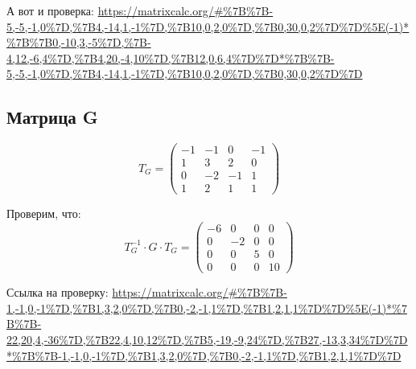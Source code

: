 \documentclass[12pt, a4paper]{article}
\begin{document}
    А вот и проверка:
    \url{https://matrixcalc.org/#%7B%7B-5,-5,-1,0%7D,%7B4,-14,1,-1%7D,%7B10,0,2,0%7D,%7B0,30,0,2%7D%7D%5E(-1)*%7B%7B0,-10,3,-5%7D,%7B-4,12,-6,4%7D,%7B4,20,-4,10%7D,%7B12,0,6,4%7D%7D*%7B%7B-5,-5,-1,0%7D,%7B4,-14,1,-1%7D,%7B10,0,2,0%7D,%7B0,30,0,2%7D%7D}



    \subsection{Матрица G}

    \begin{equation}
        T_G = \begin{pmatrix}
            -1 & -1 & 0 & -1 \\
            1 & 3 & 2 & 0 \\
            0 & -2 & -1 & 1 \\
            1 & 2 & 1 & 1
        \end{pmatrix}
    \end{equation}
    
    Проверим, что:
    \begin{equation}
        T_G^{-1} \cdot G \cdot T_G = \left(\begin{matrix}
            -6 & 0 & 0 & 0 \\
            0 & -2 & 0 & 0 \\
            0 & 0 & 5 & 0 \\
            0 & 0 & 0 & 10
        \end{matrix}\right)
    \end{equation}

    Ссылка на проверку: \url{https://matrixcalc.org/#%7B%7B-1,-1,0,-1%7D,%7B1,3,2,0%7D,%7B0,-2,-1,1%7D,%7B1,2,1,1%7D%7D%5E(-1)*%7B%7B-22,20,4,-36%7D,%7B22,4,10,12%7D,%7B5,-19,-9,24%7D,%7B27,-13,3,34%7D%7D*%7B%7B-1,-1,0,-1%7D,%7B1,3,2,0%7D,%7B0,-2,-1,1%7D,%7B1,2,1,1%7D%7D}
\end{document}
